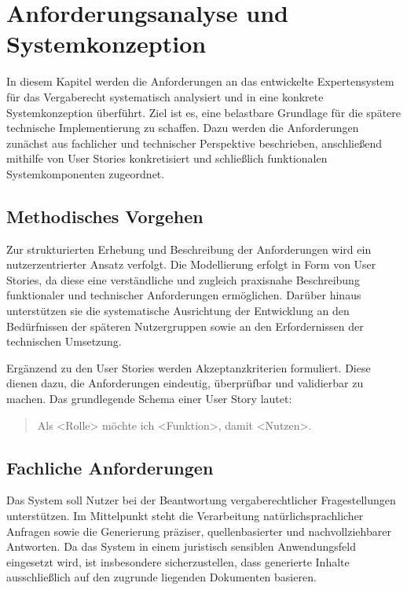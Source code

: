 

\section{Anforderungsanalyse und Systemkonzeption}
\label{sec:Systemkonzeption}

In diesem Kapitel werden die Anforderungen an das entwickelte Expertensystem für das Vergaberecht systematisch analysiert und in eine konkrete Systemkonzeption überführt. Ziel ist es, eine belastbare Grundlage für die spätere technische Implementierung zu schaffen. Dazu werden die Anforderungen zunächst aus fachlicher und technischer Perspektive beschrieben, anschließend mithilfe von User Stories konkretisiert und schließlich funktionalen Systemkomponenten zugeordnet.

\subsection{Methodisches Vorgehen}

Zur strukturierten Erhebung und Beschreibung der Anforderungen wird ein nutzerzentrierter Ansatz verfolgt. Die Modellierung erfolgt in Form von User Stories, da diese eine verständliche und zugleich praxisnahe Beschreibung funktionaler und technischer Anforderungen ermöglichen. Darüber hinaus unterstützen sie die systematische Ausrichtung der Entwicklung an den Bedürfnissen der späteren Nutzergruppen sowie an den Erfordernissen der technischen Umsetzung.

Ergänzend zu den User Stories werden Akzeptanzkriterien formuliert. Diese dienen dazu, die Anforderungen eindeutig, überprüfbar und validierbar zu machen. Das grundlegende Schema einer User Story lautet:

\begin{quote}
Als <Rolle> möchte ich <Funktion>, damit <Nutzen>.
\end{quote}

\subsection{Fachliche Anforderungen}
Das System soll Nutzer bei der Beantwortung vergaberechtlicher Fragestellungen unterstützen. Im Mittelpunkt steht die Verarbeitung natürlichsprachlicher Anfragen sowie die Generierung präziser, quellenbasierter und nachvollziehbarer Antworten. Da das System in einem juristisch sensiblen Anwendungsfeld eingesetzt wird, ist insbesondere sicherzustellen, dass generierte Inhalte ausschließlich auf den zugrunde liegenden Dokumenten basieren.

